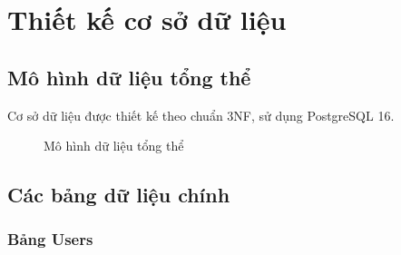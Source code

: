 \documentclass[12pt,a4paper]{report}
\begin{document}
\section{Thiết kế cơ sở dữ liệu}

\subsection{Mô hình dữ liệu tổng thể}

Cơ sở dữ liệu được thiết kế theo chuẩn 3NF, sử dụng PostgreSQL 16.

\begin{figure}[H]
\centering
{}
\caption{Mô hình dữ liệu tổng thể}
\label{fig:data_model}
\end{figure}

\subsection{Các bảng dữ liệu chính}

\subsubsection{Bảng Users}
\end{document}
